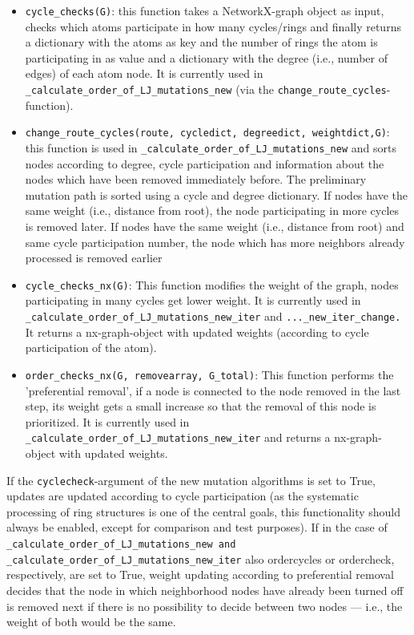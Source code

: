 \begin{itemize}
\item \texttt{cycle\_checks(G)}: this function takes a NetworkX-graph object as input, checks which atoms participate
in how many cycles/rings and finally returns a dictionary with the atoms as
key and the number of rings the atom is participating in as value
and a dictionary with the degree (i.e., number of edges) of each atom
node. It is currently used in \texttt{\_calculate\_order\_of\_LJ\_mutations\_new}
(via the \texttt{change\_route\_cycles}-function).

\item \texttt{change\_route\_cycles\string(route, cycledict, degreedict, weightdict,G\string)}: this function is used in \texttt{\_calculate\_order\_of\_LJ\_mutations\_new}
and sorts nodes according to degree, cycle participation and information
about the nodes which have been removed immediately before. The preliminary mutation
path is sorted using a cycle and degree dictionary. If nodes have the same
weight (i.e., distance from root), the node participating in more cycles
is removed later. If nodes have the same weight (i.e., distance from root)
and same cycle participation number, the node which has more neighbors
already processed is removed earlier

\item \texttt{cycle\_checks\_nx(G)}: This function modifies the weight of
the graph, nodes participating in many cycles get lower weight. It
is currently used in 
\texttt{\_calculate\_order\_of\_LJ\_mutations\_new\_iter} and \texttt{...\_new\_iter\_change.} It returns a nx-graph-object
with updated weights (according to cycle participation of the atom).

\item \texttt{order\_checks\_nx(G, removearray, G\_total)}: This function
performs the 'preferential removal', if a node is connected to the
node removed in the last step, its weight gets a small increase so
that the removal of this node is prioritized. It is currently used
in\texttt{ \_calculate\_order\_of\_LJ\_mutations\_new\_iter} and returns
a nx-graph-object with updated weights.
\end{itemize}

If the \texttt{cyclecheck}-argument of the new mutation algorithms is set to True,
updates are updated according to cycle participation (as the systematic
processing of ring structures is one of the central goals, this functionality
should always be enabled, except for comparison and test purposes).
If in the case of \texttt{\_calculate\_order\_of\_LJ\_mutations\_new
and \_calculate\_order\_of\_LJ\_mutations\_new\_iter} also ordercycles
or ordercheck, respectively, are set to True, weight updating according
to preferential removal decides that the node in which neighborhood
nodes have already been turned off is removed next if there is no
possibility to decide between two nodes --- i.e., the weight of both
would be the same.

